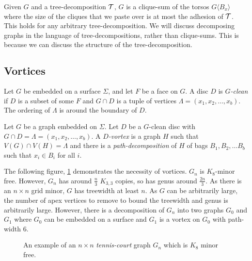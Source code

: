 Given \(G\) and a tree-decomposition \(\mathcal{T}\), \(G\) is a clique-sum of the torsos \(G\langle B_x \rangle\) where the size of the cliques that we paste over is at most the adhesion of $\mathcal{T}$. This holds for any arbitrary tree-decomposition.
We will discuss decomposing graphs in the language of tree-decompositions, rather than clique-sums. This is because we can discuss the structure of the tree-decomposition.

\subsection{Vortices}\label{sssec:vortices}
Let \(G\) be embedded on a surface \(\Sigma\), and let \(F\) be a face on \(G\). A disc $D$ is \textit{$G$-clean} if $D$ is a subset of some $F$ and $G \cap D$ is a tuple of vertices \(\Lambda = (x_1, x_2, \ldots, x_b)\). The ordering of $\Lambda$ is around the boundary of $D$. 
\par
Let $G$ be a graph embedded on $\Sigma$. Let $D$ be a $G$-clean disc with $G \cap D = \Lambda = (x_1, x_2, \ldots, x_b)$. A \textit{$D$-vortex} is a graph $H$ such that $V(G) \cap V(H) = \Lambda$ and there is a \textit{path-decomposition} of \(H\) of bags \(B_1, B_2, \ldots B_b\) such that \(x_i \in B_i\) for all \(i\).
\par
The following figure, \cref{fig:tenniscourt} demonstrates the necessity of vortices. $G_n$ is $K_8$-minor free. However, $G_n$ has around $\frac{n}{3}$ $K_{3,3}$ copies, so has genus around $\frac{2n}{3}$. As there is an $n \times n$ grid minor, $G$ has treewidth at least $n$. As $G$ can be arbitrarily large, the number of apex vertices to remove to bound the treewidth and genus is arbitrarily large. However, there is a decomposition of $G_n$ into two graphs $G_0$ and $G_1$ where $G_0$ can be embedded on a surface and $G_1$ is a vortex on $G_0$ with path-width 6. 

\begin{figure}[h]
	\centering
	
	\caption{An example of an $n \times n$ \textit{tennis-court} graph $G_n$ which is \(K_8\) minor free.}
	\label{fig:tenniscourt}
\end{figure}
